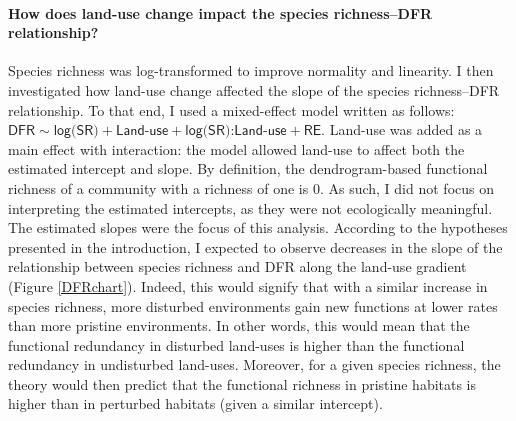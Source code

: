 \paragraph{How does land-use change impact the species richness--DFR relationship?}
Species richness was log-transformed to improve normality and linearity. I then investigated how land-use change affected the slope of the species richness--DFR relationship.  To that end, I used a mixed-effect model written as follows:  
$\textsf{DFR} \sim \textsf{log(SR)} + \textsf{Land-use} + \textsf{log(SR):Land-use} + \textsf{RE}$. Land-use was added as a main effect with interaction: the model allowed land-use to affect both the estimated intercept and slope. By definition, the dendrogram-based functional richness of a community with a richness of one is 0. As such, I did not focus on interpreting the estimated intercepts, as they were not ecologically meaningful. 
The estimated slopes were the focus of this analysis. According to the hypotheses presented in the introduction, I expected to observe decreases in the slope of the relationship between species richness and DFR along the land-use gradient (Figure \ref{DFRchart}). Indeed, this would signify that with a similar increase in species richness, more disturbed environments gain new functions at lower rates than more pristine environments.  In other words, this would mean that the functional redundancy in disturbed land-uses is higher than the functional redundancy in undisturbed land-uses. Moreover, for a given species richness, the theory would then predict that the functional richness in pristine habitats is higher than in perturbed habitats (given a similar intercept).

